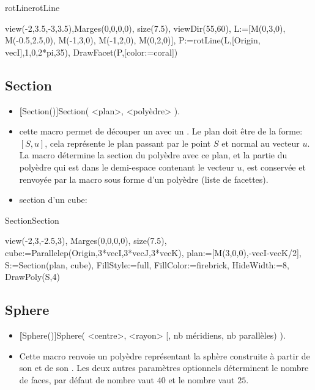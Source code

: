 \begin{demo}{rotLine}{rotLine}
\begin{texgraph}[name=rotLine]
view(-2,3.5,-3,3.5),Marges(0,0,0,0),
size(7.5), viewDir(55,60),
L:=[M(0,3,0), M(-0.5,2.5,0),
  M(-1,3,0), M(-1,2,0), M(0,2,0)],
P:=rotLine(L,[Origin, vecI],1,0,2*pi,35),
DrawFacet(P,[color:=coral])
\end{texgraph}
\end{demo}


\subsection{Section}
\begin{itemize}
 \item \util \textbf[Section()]{Section( <plan>, <polyèdre> )}.
 \item \desc cette macro permet de découper un  avec un . Le plan doit être de la forme: $[S, u]$, cela représente le plan passant par le point $S$ et normal au vecteur $u$. La macro détermine la section du polyèdre avec ce plan, et la partie du polyèdre qui est dans le demi-espace contenant le vecteur $u$, est conservée et renvoyée par la macro sous forme d'un polyèdre (liste de facettes). 
 \item \exem section d'un cube:
\end{itemize}

\begin{demo}{Section}{Section}
\begin{texgraph}[name=Section]
view(-2,3,-2.5,3), Marges(0,0,0,0), size(7.5),
cube:=Parallelep(Origin,3*vecI,3*vecJ,3*vecK),
plan:=[M(3,0,0),-vecI-vecK/2],
S:=Section(plan, cube), FillStyle:=full,
FillColor:=firebrick, HideWidth:=8,
DrawPoly(S,4)
\end{texgraph}
\end{demo}

\subsection{Sphere}
\begin{itemize}
 \item \util \textbf[Sphere()]{Sphere( <centre>, <rayon> [, nb méridiens, nb parallèles) )}.
 \item \desc Cette macro renvoie un polyèdre représentant la sphère construite à partir de son  et de son . Les deux autres paramètres optionnels déterminent le nombre de faces, par défaut de nombre  vaut $40$ et le nombre vaut $25$.
\end{itemize}


